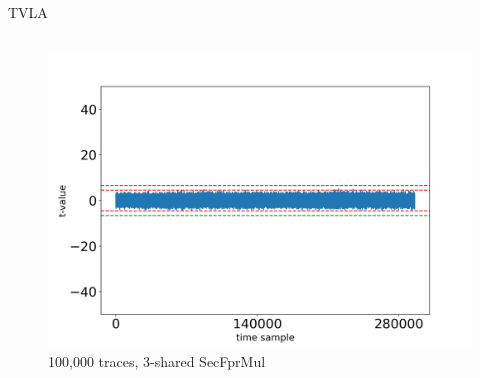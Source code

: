 \begin{frame}{TVLA}
\begin{columns}[T]
\begin{figure}
\includegraphics[width=\textwidth]{figure/tvla-F4-CHES/SecFprMul_3shares_100k.png}
\vspace{-20pt}
\caption{100,000 traces, 3-shared SecFprMul}
\end{figure}

\end{columns}


\end{frame}



